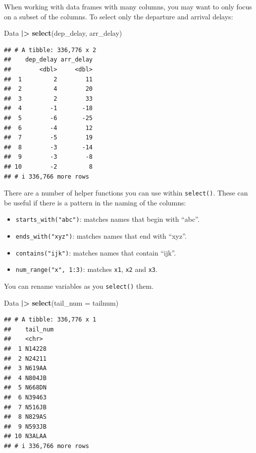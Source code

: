 \documentclass[
]{book}
\newenvironment{Shaded}{\begin{snugshade}}{\end{snugshade}}
\newcommand{\AttributeTok}[1]{\textcolor[rgb]{0.13,0.29,0.53}{#1}}
\newcommand{\FunctionTok}[1]{\textcolor[rgb]{0.13,0.29,0.53}{\textbf{#1}}}
\newcommand{\NormalTok}[1]{#1}
\newcommand{\SpecialCharTok}[1]{\textcolor[rgb]{0.81,0.36,0.00}{\textbf{#1}}}
\providecommand{\tightlist}{%
  \setlength{\itemsep}{0pt}\setlength{\parskip}{0pt}}
\theoremstyle{definition}
\theoremstyle{definition}
\theoremstyle{definition}
\theoremstyle{definition}
\theoremstyle{remark}
\begin{document}
When working with data frames with many columns, you may want to only focus on a subset of the columns. To select only the departure and arrival delays:

\begin{Shaded}
\begin{Highlighting}[]
\NormalTok{Data }\SpecialCharTok{|\textgreater{}} 
  \FunctionTok{select}\NormalTok{(dep\_delay, arr\_delay)}
\end{Highlighting}
\end{Shaded}

\begin{verbatim}
## # A tibble: 336,776 x 2
##    dep_delay arr_delay
##        <dbl>     <dbl>
##  1         2        11
##  2         4        20
##  3         2        33
##  4        -1       -18
##  5        -6       -25
##  6        -4        12
##  7        -5        19
##  8        -3       -14
##  9        -3        -8
## 10        -2         8
## # i 336,766 more rows
\end{verbatim}

There are a number of helper functions you can use within \texttt{select()}. These can be useful if there is a pattern in the naming of the columns:

\begin{itemize}
\tightlist
\item
  \texttt{starts\_with("abc")}: matches names that begin with ``abc''.
\item
  \texttt{ends\_with("xyz")}: matches names that end with ``xyz''.
\item
  \texttt{contains("ijk")}: matches names that contain ``ijk''.
\item
  \texttt{num\_range("x",\ 1:3)}: matches \texttt{x1}, \texttt{x2} and \texttt{x3}.
\end{itemize}

You can rename variables as you \texttt{select()} them.

\begin{Shaded}
\begin{Highlighting}[]
\NormalTok{Data }\SpecialCharTok{|\textgreater{}} 
  \FunctionTok{select}\NormalTok{(}\AttributeTok{tail\_num =}\NormalTok{ tailnum)}
\end{Highlighting}
\end{Shaded}

\begin{verbatim}
## # A tibble: 336,776 x 1
##    tail_num
##    <chr>   
##  1 N14228  
##  2 N24211  
##  3 N619AA  
##  4 N804JB  
##  5 N668DN  
##  6 N39463  
##  7 N516JB  
##  8 N829AS  
##  9 N593JB  
## 10 N3ALAA  
## # i 336,766 more rows
\end{verbatim}
\end{document}

